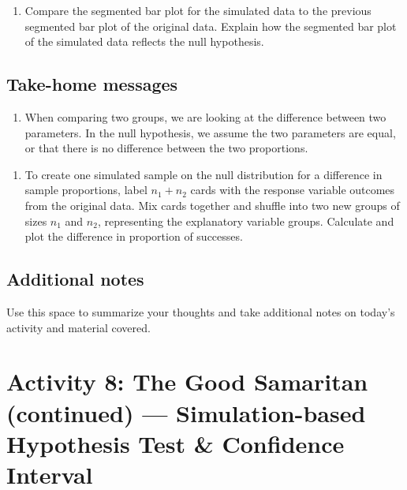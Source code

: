 \documentclass[
]{report}
\providecommand{\tightlist}{%
  \setlength{\itemsep}{0pt}\setlength{\parskip}{0pt}}
\begin{document}
\begin{enumerate}
\def\labelenumi{\arabic{enumi}.}
\setcounter{enumi}{15}
\tightlist
\item
  Compare the segmented bar plot for the simulated data to the previous segmented bar plot of the original data. Explain how the segmented bar plot of the simulated data reflects the null hypothesis.
\end{enumerate}

\vspace{1in}

\hypertarget{take-home-messages-12}{%
\subsection{Take-home messages}\label{take-home-messages-12}}

\begin{enumerate}
\def\labelenumi{\arabic{enumi}.}
\tightlist
\item
  When comparing two groups, we are looking at the difference between two parameters. In the null hypothesis, we assume the two parameters are equal, or that there is no difference between the two proportions.
\end{enumerate}

\begin{enumerate}
\def\labelenumi{\arabic{enumi}.}
\setcounter{enumi}{1}
\tightlist
\item
  To create one simulated sample on the null distribution for a difference in sample proportions, label \(n_1 + n_2\) cards with the response variable outcomes from the original data. Mix cards together and shuffle into two new groups of sizes \(n_1\) and \(n_2\), representing the explanatory variable groups. Calculate and plot the difference in proportion of successes.
\end{enumerate}

\hypertarget{additional-notes-12}{%
\subsection{Additional notes}\label{additional-notes-12}}

Use this space to summarize your thoughts and take additional notes on today's activity and material covered.

\newpage

\hypertarget{activity-8-the-good-samaritan-continued-simulation-based-hypothesis-test-confidence-interval}{%
\section{Activity 8: The Good Samaritan (continued) --- Simulation-based Hypothesis Test \& Confidence Interval}\label{activity-8-the-good-samaritan-continued-simulation-based-hypothesis-test-confidence-interval}}
\end{document}
